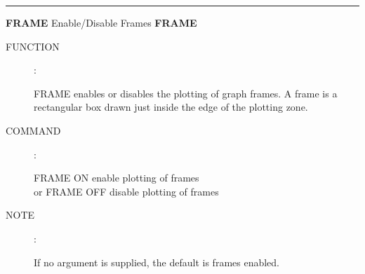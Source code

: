
\goodbreak
\rule{\textwidth}{0.3mm}
{\Large {\bf FRAME} \hfill Enable/Disable Frames \hfill {\bf FRAME}}
\begin{description}
\item [FUNCTION]:

FRAME enables or disables the plotting of graph
frames.  A frame is a rectangular box drawn just inside the
edge of the plotting zone.

\item [COMMAND]:

\begin{cmd}
\> \> FRAME ON \> enable plotting of frames \\
\> or \> FRAME OFF \> disable plotting of frames
\end{cmd}

\item [NOTE]:

If no argument is supplied, the default is frames enabled.

\end{description}


